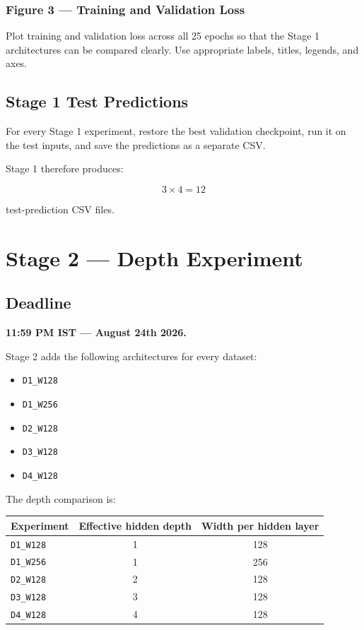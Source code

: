 \documentclass[11pt,a4paper]{article}
\newcommand{\code}[1]{\texttt{#1}}
\begin{document}
\subsubsection*{Figure 3 --- Training and Validation Loss}

Plot training and validation loss across all 25 epochs so that the Stage 1 architectures can be compared clearly. Use appropriate labels, titles, legends, and axes.

\subsection{Stage 1 Test Predictions}

For every Stage 1 experiment, restore the best validation checkpoint, run it on the test inputs, and save the predictions as a separate CSV.

Stage 1 therefore produces:

\[
3\times4=12
\]

test-prediction CSV files.

\section{Stage 2 --- Depth Experiment}

\subsection{Deadline}

\textbf{11:59 PM IST --- August 24th 2026.}

Stage 2 adds the following architectures for every dataset:

\begin{itemize}
    \item \code{D1\_W128}
    \item \code{D1\_W256}
    \item \code{D2\_W128}
    \item \code{D3\_W128}
    \item \code{D4\_W128}
\end{itemize}

The depth comparison is:

\begin{center}
\begin{tabular}{lcc}
\toprule
\textbf{Experiment} & \textbf{Effective hidden depth} & \textbf{Width per hidden layer} \\
\midrule
\code{D1\_W128} & 1 & 128 \\
\code{D1\_W256} & 1 & 256 \\
\code{D2\_W128} & 2 & 128 \\
\code{D3\_W128} & 3 & 128 \\
\code{D4\_W128} & 4 & 128 \\
\bottomrule
\end{tabular}
\end{center}
\end{document}
